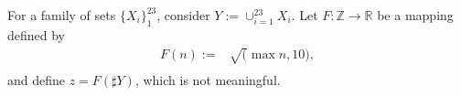 \documentclass[varwidth=8cm]{standalone}
\begin{document}
For a family of sets $\{X_i\}_1^23$, consider $Y := \cup_{i=1}^23 X_i$.
Let $F: \mathbb{Z} \to \mathbb{R}$ be a mapping defined by
\begin{align}
    F(n) := & \sqrt( \max{ n, 10 } ),\\
\end{align}
and define $z=F(\sharp Y)$, which is not meaningful.
\end{document}
